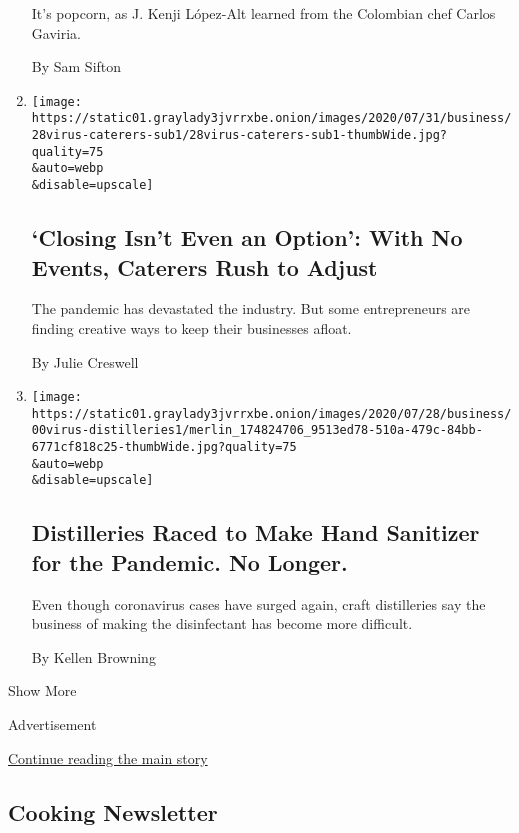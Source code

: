 \begin{enumerate}
  It's popcorn, as J. Kenji López-Alt learned from the Colombian chef
  Carlos Gaviria.

  By Sam Sifton
\item
  \href{/2020/08/04/business/coronavirus-struggling-caterers.html}{}

  \texttt{[image: https://static01.graylady3jvrrxbe.onion/images/2020/07/31/business/28virus-caterers-sub1/28virus-caterers-sub1-thumbWide.jpg?quality=75\\\&auto=webp\\\&disable=upscale]}

  \hypertarget{closing-isnt-even-an-option-with-no-events-caterers-rush-to-adjust}{%
  \subsection{`Closing Isn't Even an Option': With No Events, Caterers
  Rush to
  Adjust}\label{closing-isnt-even-an-option-with-no-events-caterers-rush-to-adjust}}

  The pandemic has devastated the industry. But some entrepreneurs are
  finding creative ways to keep their businesses afloat.

  By Julie Creswell
\item
  \href{/2020/08/04/business/distilleries-hand-sanitizer-pandemic.html}{}

  \texttt{[image: https://static01.graylady3jvrrxbe.onion/images/2020/07/28/business/00virus-distilleries1/merlin\_174824706\_9513ed78-510a-479c-84bb-6771cf818c25-thumbWide.jpg?quality=75\\\&auto=webp\\\&disable=upscale]}

  \hypertarget{distilleries-raced-to-make-hand-sanitizer-for-the-pandemic-no-longer}{%
  \subsection{Distilleries Raced to Make Hand Sanitizer for the
  Pandemic. No
  Longer.}\label{distilleries-raced-to-make-hand-sanitizer-for-the-pandemic-no-longer}}

  Even though coronavirus cases have surged again, craft distilleries
  say the business of making the disinfectant has become more difficult.

  By Kellen Browning
\end{enumerate}

Show More

Advertisement

\protect\hyperlink{after-mid2}{Continue reading the main story}

\hypertarget{cooking-newsletter}{%
\subsection{Cooking Newsletter}\label{cooking-newsletter}}

